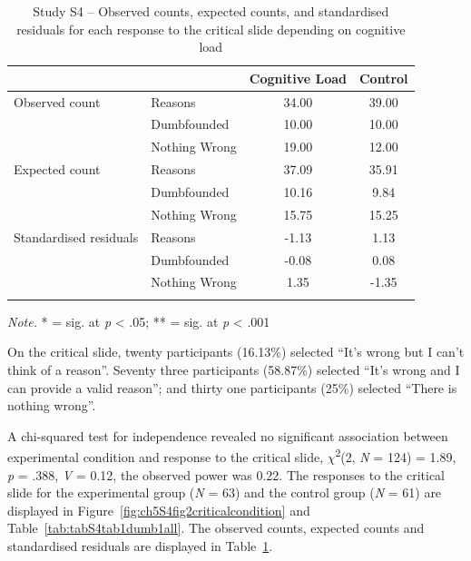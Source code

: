 \documentclass[
  american,
  man,floatsintext]{apa7}
\begin{document}
\begin{table}[tbp]

\begin{center}
\begin{threeparttable}

\caption{\label{tab:S4tab1dumb}Study S4 – Observed counts, expected counts, and standardised residuals for each response to the critical slide depending on cognitive load}

\begin{tabular}{llcc}
\toprule
 & \multicolumn{1}{c}{} & \multicolumn{1}{c}{Cognitive Load} & \multicolumn{1}{c}{Control}\\
\midrule
Observed count & Reasons & 34.00 & 39.00\\
 & Dumbfounded & 10.00 & 10.00\\
 & Nothing Wrong & 19.00 & 12.00\\
Expected count & Reasons & 37.09 & 35.91\\
 & Dumbfounded & 10.16 & 9.84\\
 & Nothing Wrong & 15.75 & 15.25\\
Standardised residuals & Reasons & -1.13 & 1.13\\
 & Dumbfounded & -0.08 & 0.08\\
 & Nothing Wrong & 1.35 & -1.35\\
\bottomrule
\addlinespace
\end{tabular}

\begin{tablenotes}[para]
\normalsize{\textit{Note.} * = sig. at \emph{p} < .05; ** = sig. at \emph{p} < .001}
\end{tablenotes}

\end{threeparttable}
\end{center}

\end{table}

On the critical slide, twenty participants (16.13\%) selected \enquote{It's wrong but I can't think of a reason}. Seventy three participants (58.87\%) selected \enquote{It's wrong and I can provide a valid reason}; and thirty one participants (25\%) selected \enquote{There is nothing wrong}.

A chi-squared test for independence revealed no significant association between experimental condition and response to the critical slide, \(\chi\)\textsuperscript{2}(2, \emph{N} = 124) = 1.89, \emph{p} = .388, \emph{V} = 0.12, the observed power was 0.22. The responses to the critical slide for the experimental group (\emph{N} = 63) and the control group (\emph{N} = 61) are displayed in Figure~\ref{fig:ch5S4fig2criticalcondition} and Table~\ref{tab:tabS4tab1dumb1all}. The observed counts, expected counts and standardised residuals are displayed in Table~\ref{tab:S4tab1dumb}.
\end{document}
